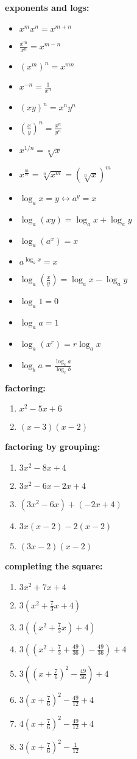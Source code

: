 \documentclass{article}
\begin{document}
\textbf{exponents and logs:} 
	\begin{itemize}
		\item $x^mx^n = x^{m+n}$
		\item $\frac{x^m}{x^n} = x^{m-n}$
		\item $(x^m)^n = x^{mn}$
		\item $x^{-n} = \frac{1}{x^n}$
		\item $(xy)^n = x^ny^n$
		\item $(\frac{x}{y})^n = \frac{x^n}{y^n}$ \item $x^{1/n} = \sqrt[n]{x}$
		\item $x^{\frac{m}{n}} = \sqrt[n]{x^m} = (\sqrt[n]{x})^m$
		\item $\log_ax = y \leftrightarrow a^y = x$
		\item $\log_a(xy) = \log_ax + \log_ay$
		\item $\log_a(a^x) = x$
		\item $a^{\log_a x} = x$
		\item $\log_a(\frac{x}{y}) = \log_ax - \log_ay$
		\item $\log_a1 = 0$
		\item $\log_aa = 1$
		\item $\log_a(x^r) = r\log_ax$
		\item $\log_ba = \frac{\log_ca}{\log_cb}$
	\end{itemize}

\textbf{factoring:}
	\begin{enumerate}
		\item $x^2 - 5x + 6$
		\item $(x - 3)(x - 2)$
	\end{enumerate}

\textbf{factoring by grouping:}
	\begin{enumerate}
		\item $3x^2 -8x + 4$
		\item $3x^2 - 6x -2x + 4$
		\item $(3x^2 - 6x) + (-2x + 4)$
		\item $3x(x - 2) - 2(x - 2)$
		\item $(3x - 2)(x-2)$
	\end{enumerate}

\textbf{completing the square:}
	\begin{enumerate}
		\item $3x^2 + 7x + 4$
		\item $3(x^2 + \frac{7}{3}x + 4)$
		\item $3((x^2 + \frac{7}{3}x) + 4)$
		\item $3((x^2 + \frac{7}{3} + \frac{49}{36}) - \frac{49}{36}) + 4$
		\item $3((x + \frac{7}{6})^2 - \frac{49}{36}) + 4$
		\item $3(x + \frac{7}{6})^2 - \frac{49}{12} + 4$
		\item $4(x + \frac{7}{6})^2 - \frac{49}{12} + 4$
		\item $3(x + \frac{7}{6})^2 - \frac{1}{12}$
	\end{enumerate}
\end{document}
